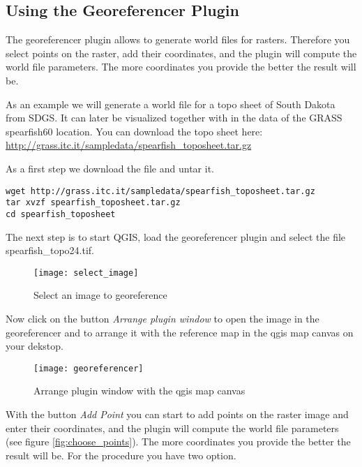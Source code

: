 \subsection{Using the Georeferencer Plugin}

The georeferencer plugin allows to generate world files for rasters. Therefore
you select points on the raster, add their coordinates, and the plugin will 
compute the world file parameters. The more coordinates you provide the better 
the result will be.

As an example we will generate a world file for a topo sheet of South Dakota 
from SDGS. It can later be visualized together with in the data of the GRASS 
spearfish60 location. You can download the topo sheet here: \\
\url{http://grass.itc.it/sampledata/spearfish\_toposheet.tar.gz}

As a first step we download the file and untar it.

\begin{verbatim}
wget http://grass.itc.it/sampledata/spearfish_toposheet.tar.gz
tar xvzf spearfish_toposheet.tar.gz
cd spearfish_toposheet
\end{verbatim}

The next step is to start QGIS, load the georeferencer plugin and select 
the file spearfish\_topo24.tif.

\begin{figure}[ht]
\begin{center}
  \caption{Select an image to georeference}\label{fig:select_image}\smallskip
  \texttt{[image: select\_image]}
\end{center}
\end{figure}

Now click on the button \textsl{Arrange plugin window} to open the image 
in the georeferencer and to arrange it with the reference map in the qgis map canvas on your dekstop.

\begin{figure}[ht]
\begin{center}
  \caption{Arrange plugin window with the qgis map canvas}\label{fig:georeferencer}\smallskip
  \texttt{[image: georeferencer]}
\end{center}
\end{figure}

With the button \textsl{Add Point} you can start to add points on the 
raster image and enter their coordinates, and the plugin will compute the 
world file parameters (see figure \ref{fig:choose_points}). The more coordinates you provide the better the 
result will be. For the procedure you have two option. 

